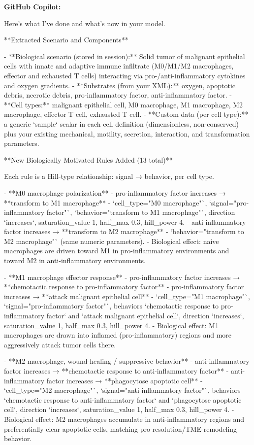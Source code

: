 \documentclass[11pt,a4paper]{article}
\begin{document}
\begin{copilotbox}
\textbf{GitHub Copilot:}

Here’s what I’ve done and what’s now in your model.

**Extracted Scenario and Components**

- **Biological scenario (stored in session):** Solid tumor of malignant epithelial cells with innate and adaptive immune infiltrate (M0/M1/M2 macrophages, effector and exhausted T cells) interacting via pro-/anti-inflammatory cytokines and oxygen gradients.
- **Substrates (from your XML):** oxygen, apoptotic debris, necrotic debris, pro-inflammatory factor, anti-inflammatory factor.
- **Cell types:** malignant epithelial cell, M0 macrophage, M1 macrophage, M2 macrophage, effector T cell, exhausted T cell.
- **Custom data (per cell type):** a generic `sample` scalar in each cell definition (dimensionless, non-conserved) plus your existing mechanical, motility, secretion, interaction, and transformation parameters.

**New Biologically Motivated Rules Added (13 total)**

Each rule is a Hill-type relationship: signal → behavior, per cell type.

- **M0 macrophage polarization**
  - pro-inflammatory factor increases → **transform to M1 macrophage**
    - `cell\_type="M0 macrophage"`, `signal="pro-inflammatory factor"`, `behavior="transform to M1 macrophage"`, direction `increases`, saturation\_value 1, half\_max 0.3, hill\_power 4.
  - anti-inflammatory factor increases → **transform to M2 macrophage**
    - `behavior="transform to M2 macrophage"` (same numeric parameters).
  - Biological effect: naive macrophages are driven toward M1 in pro-inflammatory environments and toward M2 in anti-inflammatory environments.

- **M1 macrophage effector response**
  - pro-inflammatory factor increases → **chemotactic response to pro-inflammatory factor**
  - pro-inflammatory factor increases → **attack malignant epithelial cell**
    - `cell\_type="M1 macrophage"`, `signal="pro-inflammatory factor"`, behaviors `chemotactic response to pro-inflammatory factor` and `attack malignant epithelial cell`, direction `increases`, saturation\_value 1, half\_max 0.3, hill\_power 4.
  - Biological effect: M1 macrophages are drawn into inflamed (pro-inflammatory) regions and more aggressively attack tumor cells there.

- **M2 macrophage, wound-healing / suppressive behavior**
  - anti-inflammatory factor increases → **chemotactic response to anti-inflammatory factor**
  - anti-inflammatory factor increases → **phagocytose apoptotic cell**
    - `cell\_type="M2 macrophage"`, `signal="anti-inflammatory factor"`, behaviors `chemotactic response to anti-inflammatory factor` and `phagocytose apoptotic cell`, direction `increases`, saturation\_value 1, half\_max 0.3, hill\_power 4.
  - Biological effect: M2 macrophages accumulate in anti-inflammatory regions and preferentially clear apoptotic cells, matching pro-resolution/TME-remodeling behavior.


\end{copilotbox}
\end{document}
